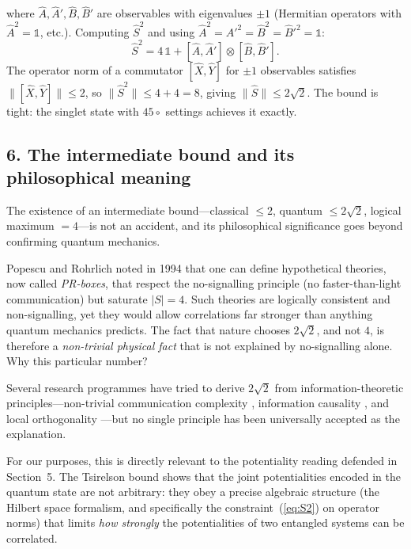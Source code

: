 where $\hat{A}, \hat{A}', \hat{B}, \hat{B}'$ are observables with eigenvalues $\pm1$ (Hermitian operators with $\hat{A}^2 = \mathbb{1}$, etc.). Computing $\hat{S}^2$ and using $\hat{A}^2 = \hat{A}'^2 = \hat{B}^2 = \hat{B}'^2 = \mathbb{1}$:
\begin{equation}
  \hat{S}^2 = 4\,\mathbb{1} + [\hat{A},\hat{A}']\otimes[\hat{B},\hat{B}'].
  \label{eq:S2}
\end{equation}
The operator norm of a commutator $[\hat{X},\hat{Y}]$ for $\pm1$ observables satisfies $\|[\hat{X},\hat{Y}]\| \leq 2$, so $\|\hat{S}^2\| \leq 4 + 4 = 8$, giving $\|\hat{S}\| \leq 2\sqrt{2}$. The bound is tight: the singlet state with $45\circ$ settings achieves it exactly.

\subsection*{6. The intermediate bound and its philosophical meaning}

The existence of an intermediate bound---classical $\leq 2$, quantum $\leq 2\sqrt{2}$, logical maximum $= 4$---is not an accident, and its philosophical significance goes beyond confirming quantum mechanics.

\medskip

Popescu and Rohrlich noted in 1994 \cite{popescu_1994_pr} that one can define hypothetical theories, now called \textit{PR-boxes}, that respect the no-signalling principle (no faster-than-light communication) but saturate $|S| = 4$. Such theories are logically consistent and non-signalling, yet they would allow correlations far stronger than anything quantum mechanics predicts. The fact that nature chooses $2\sqrt{2}$, and not $4$, is therefore a \textit{non-trivial physical fact} that is not explained by no-signalling alone. Why this particular number?

\medskip

Several research programmes have tried to derive $2\sqrt{2}$ from information-theoretic principles---non-trivial communication complexity \cite{brassard_2006_limits}, information causality \cite{pawlowski_2009_information}, and local orthogonality \cite{fritz_2013_local}---but no single principle has been universally accepted as the explanation.

\medskip

For our purposes, this is directly relevant to the potentiality reading defended in Section~5. The Tsirelson bound shows that the joint potentialities encoded in the quantum state are not arbitrary: they obey a precise algebraic structure (the Hilbert space formalism, and specifically the constraint~(\ref{eq:S2}) on operator norms) that limits \textit{how strongly} the potentialities of two entangled systems can be correlated.

